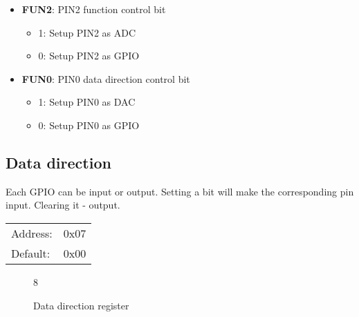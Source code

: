 \documentclass{article}
\begin{document}
		\begin{itemize}
			\item \textbf{FUN2}: PIN2 function control bit
			\begin{itemize}
				\item 1: Setup PIN2 as ADC
				\item 0: Setup PIN2 as GPIO
			\end{itemize}
			\item \textbf{FUN0}: PIN0 data direction control bit
			\begin{itemize}
				\item 1: Setup PIN0 as DAC
				\item 0: Setup PIN0 as GPIO
			\end{itemize}
		\end{itemize}


	\subsection{Data direction}

		Each GPIO can be input or output. Setting a bit will make the corresponding pin input.
		Clearing it - output.

		\begin{tabular}{ l c }
			Address: & 0x07 \\
			Default: & 0x00 \\
		\end{tabular}

		\begin{figure}[H]
			\centering
			\begin{bytefield}[
				bitwidth=0.1\linewidth]{8}
				 \\
			\end{bytefield}
			\caption{Data direction register}
			\label{reg:data_dir}
		\end{figure}
\end{document}
